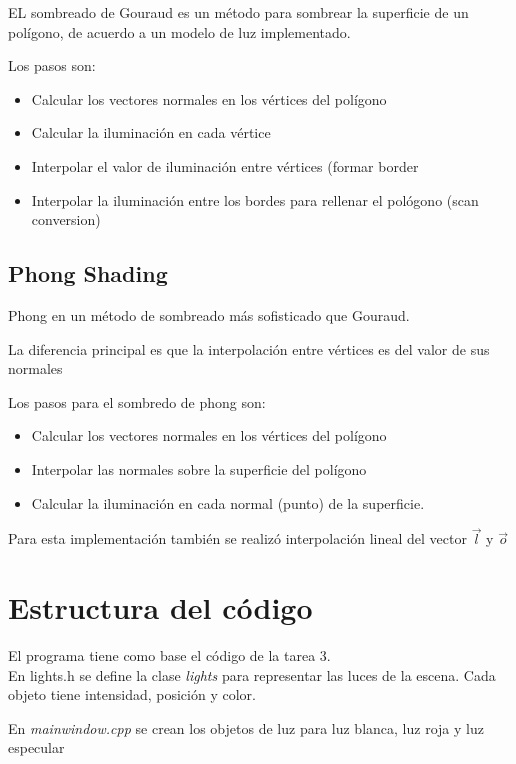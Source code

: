 \documentclass[12pt]{article}
\begin{document}
EL sombreado de Gouraud es un método para sombrear la superficie de un polígono, de acuerdo a un modelo de luz implementado.

Los pasos son:

\begin{itemize}
\item Calcular los vectores normales en los vértices del polígono
\item Calcular la iluminación en cada vértice
\item Interpolar el valor de iluminación entre vértices (formar border
\item Interpolar la iluminación entre los bordes para rellenar el pológono (scan conversion)
\end{itemize}



\subsection{Phong Shading}


Phong en un método de sombreado más sofisticado que Gouraud.

La diferencia principal es que la interpolación entre vértices es del valor de sus normales

Los pasos para el sombredo de phong son:

\begin{itemize}
\item Calcular los vectores normales en los vértices del polígono
\item Interpolar las normales sobre la superficie del polígono
\item Calcular la iluminación en cada normal (punto) de la superficie.

\end{itemize}
 
 
 Para esta implementación también se realizó interpolación lineal del vector $\vec{l}$ y $\vec{o}$

\section{Estructura del código}

El programa tiene como base el código de la tarea 3.\\

En lights.h se define la clase \textit{lights} para representar las luces de la escena. Cada objeto tiene intensidad, posición y color.

En \textit{mainwindow.cpp} se crean los objetos de luz para luz blanca, luz roja y luz especular
\end{document}
